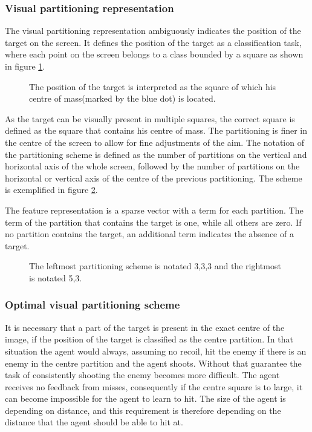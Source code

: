\subsubsection{Visual partitioning representation}
\label{sec:vpr}
The visual partitioning representation ambiguously indicates the position of the target on the screen. It defines the position of the target as a classification task, where each point on the screen belongs to a class bounded by a square as shown in figure \ref{fig:visualpartitioning}. 
\begin{figure}[H]
    \centering
    	
    \caption[Visual partitioning representation]{The position of the target is interpreted as the square of which his centre of mass(marked by the blue dot) is located.}
    \label{fig:visualpartitioning}
\end{figure}
\noindent
As the target can be visually present in multiple squares, the correct square is defined as the square that contains his centre of mass. The partitioning is finer in the centre of the screen to allow for fine adjustments of the aim. The notation of the partitioning scheme is defined as the number of partitions on the vertical and horizontal axis of the whole screen, followed by the number of partitions on the horizontal or vertical axis of the centre of the previous partitioning. The scheme is exemplified in figure \ref{fig:visualpartitioningcompared}.

The feature representation is a sparse vector with a term for each partition. The term of the partition that contains the target is one, while all others are zero. If no partition contains the target, an additional term indicates the absence of a target.
\begin{figure}[H]
    \centering
    	
    \caption[Partitioning schemes]{The leftmost partitioning scheme is notated 3,3,3 and the rightmost is notated 5,3.}
    \label{fig:visualpartitioningcompared}
\end{figure}

\subsubsection{Optimal visual partitioning scheme}
It is necessary that a part of the target is present in the exact centre of the image, if the position of the target is classified as the centre partition. In that situation the agent would always, assuming no recoil, hit the enemy if there is an enemy in the centre partition and the agent shoots. Without that guarantee the task of consistently shooting the enemy becomes more difficult. The agent receives no feedback from misses, consequently if the centre square is to large, it can become impossible for the agent to learn to hit. The size of the agent is depending on distance, and this requirement is therefore depending on the distance that the agent should be able to hit at.

